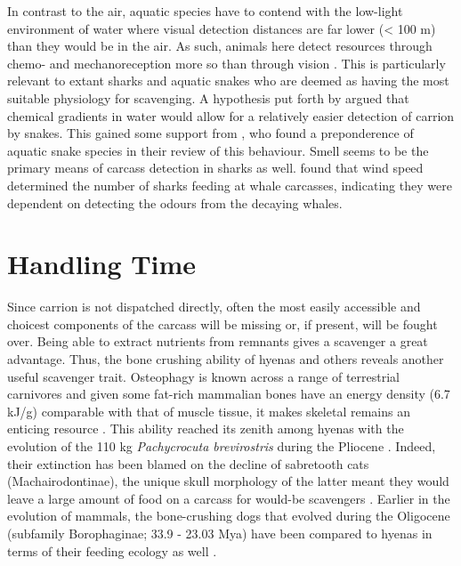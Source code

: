 \documentclass[a4paper,12pt]{article}
\begin{document}

In contrast to the air, aquatic species have to contend with the low-light environment of water where visual detection distances are far lower (< 100 m) than they would be in the air.
As such, animals here detect resources through chemo- and mechanoreception more so than through vision \citep{ruxton2004energetic}.
This is particularly relevant to extant sharks and aquatic snakes who are deemed as having the most suitable physiology for scavenging.
A hypothesis put forth by \cite{sazima1990necrofagia} argued that chemical gradients in water would allow for a relatively easier detection of carrion by snakes.
This gained some support from \cite{devault2002scavenging}, who found a preponderence of aquatic snake species in their review of this behaviour.
Smell seems to be the primary means of carcass detection in sharks as well. 
\cite{fallows2013white} found that wind speed determined the number of sharks feeding at whale carcasses, indicating they were dependent on detecting the odours from the decaying whales. 

\section*{Handling Time}
Since carrion is not dispatched directly, often the most easily accessible and choicest components of the carcass will be missing or, if present, will be fought over.
Being able to extract nutrients from remnants gives a scavenger a great advantage.
Thus, the bone crushing ability of hyenas and others reveals another useful scavenger trait.
Osteophagy is known across a range of terrestrial carnivores and given some fat-rich mammalian bones have an energy density (6.7 kJ/g) comparable with that of muscle tissue, it makes skeletal remains an enticing resource \citep{brown1989study}.
This ability reached its zenith among hyenas with the evolution of the 110 kg \textit{Pachycrocuta brevirostris} during the Pliocene \citep[3.6 - 2.58 Mya; ][]{palmqvist2011giant}.
Indeed, their extinction has been blamed on the decline of sabretooth cats (Machairodontinae), the unique skull morphology of the latter meant they would leave a large amount of food on a carcass for would-be scavengers \citep{palmqvist2011giant}. 
Earlier in the evolution of mammals, the bone-crushing dogs that evolved during the Oligocene (subfamily Borophaginae; 33.9 - 23.03 Mya) have been compared to hyenas in terms of their feeding ecology as well \citep{van2003chapter,martin2016pursuit}.
\end{document}
